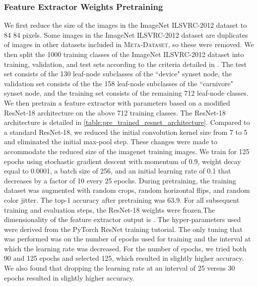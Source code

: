 \documentclass{article}
\theoremstyle{definition}
\begin{document}
\subsubsection{Feature Extractor Weights \texorpdfstring{}{TEXT} Pretraining}
\label{app:feature_extractor_pretraining}
We first reduce the size of the images in the ImageNet ILSVRC-2012 dataset \citep{russakovsky2015imagenet} to 84  84 pixels. Some images in the ImageNet ILSVRC-2012 dataset are duplicates of images in other datasets included in \textsc{Meta-Dataset}, so these were removed. We then split the 1000 training classes of the ImageNet ILSVRC-2012 dataset into training, validation, and test sets according to the criteria detailed in \citep{triantafillou2019meta}. The test set consists of the 130 leaf-node subclasses of the ``device" synset node, the validation set consists of the the 158 leaf-node subclasses of the ``carnivore" synset node, and the training set consists of the remaining 712 leaf-node classes. We then pretrain a feature extractor with parameters  based on a modified ResNet-18 \citep{he2016deep} architecture on the above 712 training classes. The ResNet-18 architecture is detailed in \cref{table:pre_trained_resnet_architecture}. Compared to a standard ResNet-18, we reduced the initial convolution kernel size from 7 to 5 and eliminated the initial max-pool step. These changes were made to accommodate the reduced size of the imagenet training images. We train for 125 epochs using stochastic gradient descent with momentum of 0.9, weight decay equal to 0.0001, a batch size of 256, and an initial learning rate of 0.1 that decreases by a factor of 10 every 25 epochs. During pretraining, the training dataset was augmented with random crops, random horizontal flips, and random color jitter. The top-1 accuracy after pretraining was 63.9. For all subsequent training and evaluation steps, the ResNet-18 weights were frozen.The dimensionality of the feature extractor output is . The hyper-parameters used were derived from the PyTorch \citep{paszke2017automatic} ResNet training tutorial. The only tuning that was performed was on the number of epochs used for training and the interval at which the learning rate was decreased. For the number of epochs, we tried both 90 and 125 epochs and selected 125, which resulted in slightly higher accuracy. We also found that dropping the learning rate at an interval of 25 versus 30 epochs resulted in slightly higher accuracy. 
\end{document}
